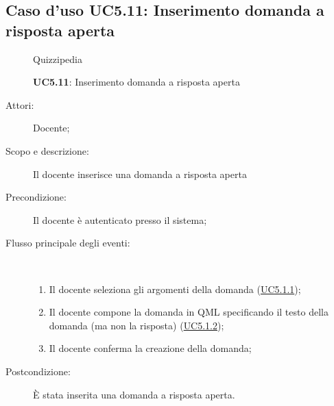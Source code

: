 \subsection{Caso d'uso UC5.11: Inserimento domanda a risposta aperta}
	\begin{figure}[H]
		\centering
		\begin{resizedtikzpicture}{\textwidth}
		\begin{umlsystem}[x=0, fill=lightgray!20]{Quizzipedia}
		\end{umlsystem}
		\end{resizedtikzpicture}
		\caption{\textbf{UC5.11}: Inserimento domanda a risposta aperta}
		\label{UC5.11}
	\end{figure}
\begin{description}
\item[Attori:] Docente;
\item[Scopo e descrizione:] Il docente inserisce una domanda a risposta aperta
      \item[Precondizione:] Il docente è autenticato presso il sistema;

        \item[Flusso principale degli eventi:] \ 
 \begin{enumerate}
          \item Il docente seleziona gli argomenti della domanda (\hyperlink{UC5.1.1}{UC5.1.1});
          \item Il docente compone la domanda in QML specificando il testo della domanda (ma non la risposta) (\hyperlink{UC5.1.2}{UC5.1.2});
          \item Il docente conferma la creazione della domanda;

      \end{enumerate}
    \item[Postcondizione:] È stata inserita una domanda a risposta aperta.
  \end{description}
\hypertarget{UC5.12}{}
